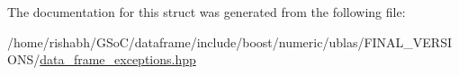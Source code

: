 The documentation for this struct was generated from the following file\+:\begin{DoxyCompactItemize}
\item 
/home/rishabh/\+G\+So\+C/dataframe/include/boost/numeric/ublas/\+F\+I\+N\+A\+L\+\_\+\+V\+E\+R\+S\+I\+O\+N\+S/\hyperlink{data__frame__exceptions_8hpp}{data\+\_\+frame\+\_\+exceptions.\+hpp}\end{DoxyCompactItemize}
